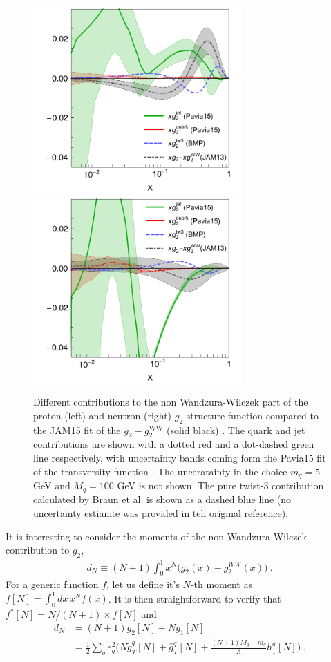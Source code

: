\documentclass[preprintnumbers,floatfix,nofootinbib]{revtex4}
\begin{document}
\begin{figure}[tbh]
\begin{center}
\includegraphics[width=8cm]{g2contrib}
\includegraphics[width=8cm]{g2contribN}
\caption{\label{f:g2contrib} 
Different contributions to the non Wandzura-Wilczek part of the proton (left) and neutron (right) $g_2$ structure function compared to the JAM15 fit of the  $g_2-g_2^{\text{WW}}$ (solid black) \cite{JAM15}. The quark and jet contributions are shown with a dotted red and a dot-dashed green line respectively, with uncertainty bands coming form the Pavia15 fit of the transversity function \cite{Pavia15}. The unceratainty in the choice $m_q=5$ GeV and $M_q=100$ GeV is not shown. The pure twist-3 contribution calculated by Braun et al. \cite{Braun-et-al} is shown as a dashed blue line (no uncertainty estiamte was provided in teh original reference).
}
\end{center}
\end{figure}

It is interesting to consider the moments of the non Wandzura-Wilczek contribution to $g_2$,
\begin{align}
  d_N \equiv (N+1) \int_0^1 x^N \bigg( g_2(x) - g_2^{WW}(x) \bigg) \ .
\end{align}
For a generic function $f$, let us define it's $N$-th moment as $f[N]=\int_0^1 dx\, x^{N} f(x)$. It is then straightforward to verify that $f^*[N] = N/(N+1) \times f[N]$ and  
\begin{align}
  d_N & = (N+1) g_2[N] + N g_1[N] \\
  & = \frac12 \sum_q e_q^2 \bigg( N \tilde g_T^q[N] + \hat g_T^q[N]
    + \frac{(N+1) M_q-m_q}{\Lambda} h_1^q[N] \bigg) \ .
\end{align}
\end{document}
